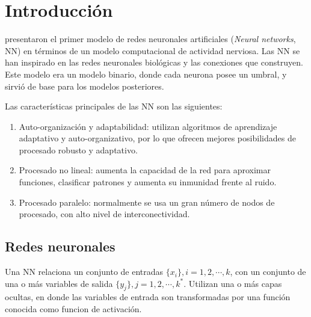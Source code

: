 

\chapter{Introducción}
 presentaron el primer modelo de redes neuronales artificiales ({\em Neural networks}, NN) en términos de un modelo computacional de actividad nerviosa. Las NN se han inspirado en las redes neuronales biológicas y las conexiones que construyen. Este modelo era un modelo binario, donde cada neurona posee un umbral, y sirvió de base para los modelos posteriores.

Las características principales de las NN son las siguientes:
\begin{enumerate}
	\item Auto-organización y adaptabilidad: utilizan algoritmos de aprendizaje adaptativo y auto-organizativo, por lo que ofrecen mejores posibilidades de procesado robusto y adaptativo.

	\item Procesado no lineal: aumenta la capacidad de la red para aproximar funciones, clasificar patrones y aumenta su inmunidad frente al ruido.

	\item Procesado paralelo: normalmente se usa un gran número de nodos de procesado, con alto nivel de interconectividad.
\end{enumerate}

\section{Redes neuronales}
Una NN relaciona un conjunto de entradas $\{x_{i}\}, i = 1, 2, \cdots, k$, con un conjunto de una o más variables de salida $\{y_j\}, j = 1, 2, \cdots, k^{*}$. Utilizan una o más capas ocultas, en donde las variables de entrada son transformadas por una función conocida como funcion de activación.



